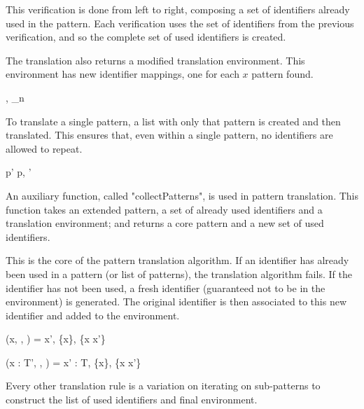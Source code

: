 \documentclass[class=article, crop=false]{standalone}
\begin{document}
This verification is done from left to right, composing a set of identifiers already used in the pattern.
Each verification uses the set of identifiers from the previous verification, and so the complete set of used identifiers is created.

The translation also returns a modified translation environment.
This environment has new identifier mappings, one for each $x$ pattern found.

  {\gamma \vdash [p_1', \; \dots \; p_n'] \Rightarrow [p_1, \; \dots \; p_n], \gamma_n}

To translate a single pattern, a list with only that pattern is created and then translated.
This ensures that, even within a single pattern, no identifiers are allowed to repeat.

  {\gamma \vdash p' \Rightarrow p, \gamma'}

An auxiliary function, called "collectPatterns", is used in pattern translation.
This function takes an extended pattern, a set of already used identifiers and a translation environment; and returns a core pattern and a new set of used identifiers.

\bigskip

This is the core of the pattern translation algorithm.
If an identifier has already been used in a pattern (or list of patterns), the translation algorithm fails.
If the identifier has not been used, a fresh identifier (guaranteed not to be in the environment) is generated.
The original identifier is then associated to this new identifier and added to the environment.

  {(x, , \gamma) = x',  \cup \{x\}, \gamma \cup \{x \rightarrow x'\}}

  {(x : T', , \gamma) = x' : T,  \cup \{x\}, \gamma \cup \{x \rightarrow x'\}}

\bigskip

Every other translation rule is a variation on iterating on sub-patterns to construct the list of used identifiers and final environment.
\end{document}
